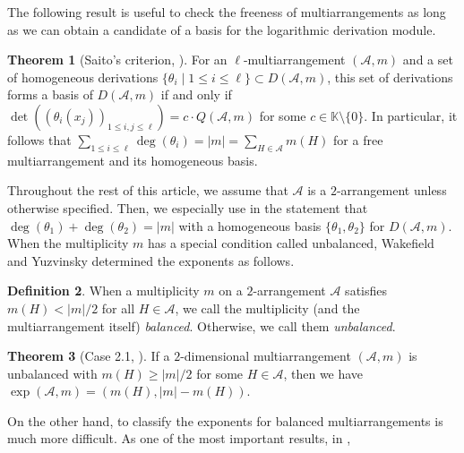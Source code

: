 \documentclass[12pt]{amsart}
\theoremstyle{definition}
\newtheorem{definition}{Definition}[section]
\newtheorem{theorem}[definition]{Theorem}
\newcommand{\KK}{\mathbb{K}}
\newcommand{\AAA}{\mathcal{A}}
\begin{document}
The following result is useful to check the freeness of multiarrangements 
as long as we can obtain a candidate of a basis for the logarithmic derivation module. 
\begin{theorem}[Saito's criterion, \cite{Saito,Ziegler}]
\label{theorem:Saito's criterion} %
    For an $\ell$-multiarrangement $(\AAA,m)$ 
    and a set of homogeneous derivations 
    $\{\theta_{i} \mid 1 \leq i \leq \ell\} \subset D(\AAA,m)$, 
    this set of derivations forms a basis of $D(\AAA,m)$ if and only if 
    $\det((\theta_i(x_j))_{1 \leq i,j \leq \ell})=c\cdot Q(\AAA,m)$ 
    for some $c\in\KK\setminus\{0\}$.
    In particular, it follows that 
    $\sum_{1 \leq i \leq \ell}\deg(\theta_i)=|m|=\sum_{H\in\AAA}m(H)$ 
    for a free multiarrangement and its homogeneous basis.
\end{theorem}
Throughout the rest of this article, 
we assume that $\AAA$ is a $2$-arrangement unless otherwise specified. 
Then, we especially use  %
in the statement that %
$\deg(\theta_1)+\deg(\theta_2)=|m|$ with a homogeneous basis $\{\theta_1,\theta_2\}$ 
for $D(\AAA,m)$. 
%
When the multiplicity $m$ %
has a special condition called unbalanced, 
Wakefield and Yuzvinsky determined the exponents %
as follows. %
%
\begin{definition}\label{definition:balanced} %
    When a multiplicity $m$ on a $2$-arrangement $\AAA$ satisfies 
    $m(H)<|m|/2$ for all $H\in\AAA$, 
    we call the multiplicity (and the multiarrangement itself) \emph{balanced}. 
    Otherwise, 
    we call %
    them \emph{unbalanced}. 
\end{definition}
\begin{theorem}[Case 2.1, \cite{Wakefield-Yuzvinsky}]\label{theorem:unbalanced}
    If a $2$-dimensional multiarrangement $(\AAA,m)$ is unbalanced 
    with $m(H)\geq|m|/2$ for some $H\in\AAA$, 
    then we have $\exp(\AAA,m)=(m(H),|m|-m(H))$. 
\end{theorem}
%
    On the other hand, to classify the exponents for 
    balanced multiarrangements 
    is much more difficult. 
    As one of the most important results, in \cite{Abe:chamber}, 
\end{document}
